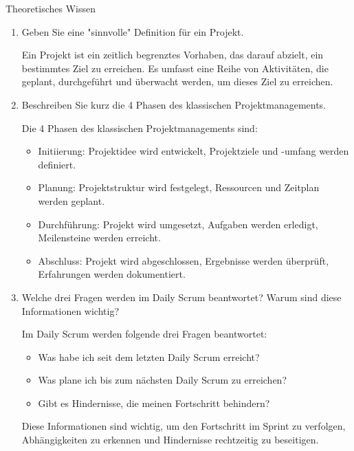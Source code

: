 \documentclass{article}
\begin{document}
\begin{exercise}{Theoretisches Wissen}
  \begin{enumerate}
    \item Geben Sie eine "sinnvolle" Definition für ein Projekt.

          \begin{solution}
            Ein Projekt ist ein zeitlich begrenztes Vorhaben, das darauf abzielt, ein bestimmtes Ziel zu erreichen. Es umfasst eine Reihe von Aktivitäten, die geplant, durchgeführt und überwacht werden, um dieses Ziel zu erreichen.
          \end{solution}

    \item Beschreiben Sie kurz die 4 Phasen des klassischen Projektmanagements.

          \begin{solution}
            Die 4 Phasen des klassischen Projektmanagements sind:
            \begin{itemize}
              \item Initiierung: Projektidee wird entwickelt, Projektziele und -umfang werden definiert.
              \item Planung: Projektstruktur wird festgelegt, Ressourcen und Zeitplan werden geplant.
              \item Durchführung: Projekt wird umgesetzt, Aufgaben werden erledigt, Meilensteine werden erreicht.
              \item Abschluss: Projekt wird abgeschlossen, Ergebnisse werden überprüft, Erfahrungen werden dokumentiert.
            \end{itemize}
          \end{solution}

    \item Welche drei Fragen werden im Daily Scrum beantwortet? Warum sind diese Informationen wichtig?

          \begin{solution}
            Im Daily Scrum werden folgende drei Fragen beantwortet:
            \begin{itemize}
              \item Was habe ich seit dem letzten Daily Scrum erreicht?
              \item Was plane ich bis zum nächsten Daily Scrum zu erreichen?
              \item Gibt es Hindernisse, die meinen Fortschritt behindern?
            \end{itemize}
            Diese Informationen sind wichtig, um den Fortschritt im Sprint zu verfolgen, Abhängigkeiten zu erkennen und Hindernisse rechtzeitig zu beseitigen.
          \end{solution}


\end{enumerate}
\end{exercise}
\end{document}
